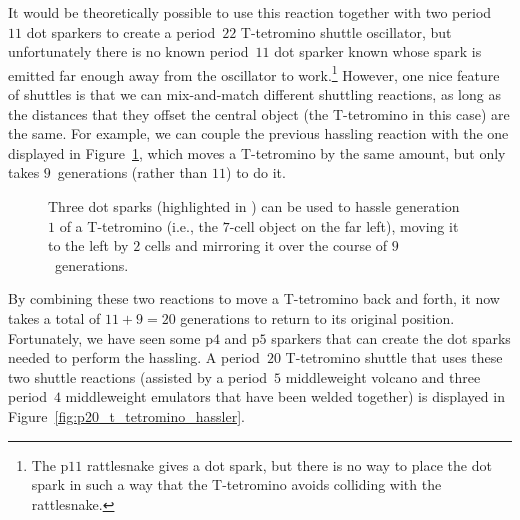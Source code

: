 It would be theoretically possible to use this reaction together with two period~$11$ dot sparkers to create a period~$22$ T-tetromino shuttle oscillator, but unfortunately there is no known period~$11$ dot sparker known whose spark is emitted far enough away from the oscillator to work.\footnote{The p$11$ rattlesnake gives a dot spark, but there is no way to place the dot spark in such a way that the T-tetromino avoids colliding with the rattlesnake.} However, one nice feature of shuttles is that we can mix-and-match different shuttling reactions, as long as the distances that they offset the central object (the T-tetromino in this case) are the same. For example, we can couple the previous hassling reaction with the one displayed in Figure~\ref{fig:t_tetromino_hassle_2}, which moves a T-tetromino by the same amount, but only takes $9$~generations (rather than $11$) to do it.

\begin{figure}[!htb]
	\centering
	\caption{Three dot sparks (highlighted in ) can be used to hassle generation~$1$ of a T-tetromino (i.e., the $7$-cell object on the far left), moving it to the left by $2$ cells and mirroring it over the course of $9$~generations.}\label{fig:t_tetromino_hassle_2}
\end{figure}

By combining these two reactions to move a T-tetromino back and forth, it now takes a total of $11 + 9 = 20$ generations to return to its original position. Fortunately, we have seen some p$4$ and p$5$ sparkers that can create the dot sparks needed to perform the hassling. A period~$20$ T-tetromino shuttle that uses these two shuttle reactions (assisted by a period~$5$ middleweight volcano and three period~$4$ middleweight emulators that have been welded together) is displayed in Figure~\ref{fig:p20_t_tetromino_hassler}.

